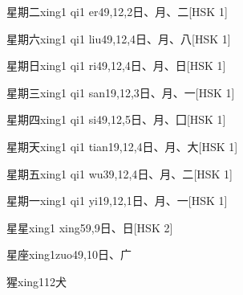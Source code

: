 \begin{entry}{星期二}{xing1 qi1 er4}{9,12,2}{⽇、⽉、⼆}[HSK 1]
\end{entry}

\begin{entry}{星期六}{xing1 qi1 liu4}{9,12,4}{⽇、⽉、⼋}[HSK 1]
\end{entry}

\begin{entry}{星期日}{xing1 qi1 ri4}{9,12,4}{⽇、⽉、⽇}[HSK 1]
\end{entry}

\begin{entry}{星期三}{xing1 qi1 san1}{9,12,3}{⽇、⽉、⼀}[HSK 1]
\end{entry}

\begin{entry}{星期四}{xing1 qi1 si4}{9,12,5}{⽇、⽉、⼞}[HSK 1]
\end{entry}

\begin{entry}{星期天}{xing1 qi1 tian1}{9,12,4}{⽇、⽉、⼤}[HSK 1]
\end{entry}

\begin{entry}{星期五}{xing1 qi1 wu3}{9,12,4}{⽇、⽉、⼆}[HSK 1]
\end{entry}

\begin{entry}{星期一}{xing1 qi1 yi1}{9,12,1}{⽇、⽉、⼀}[HSK 1]
\end{entry}

\begin{entry}{星星}{xing1 xing5}{9,9}{⽇、⽇}[HSK 2]
\end{entry}

\begin{entry}{星座}{xing1zuo4}{9,10}{⽇、⼴}
\end{entry}

\begin{entry}{猩}{xing1}{12}{⽝}
\end{entry}

